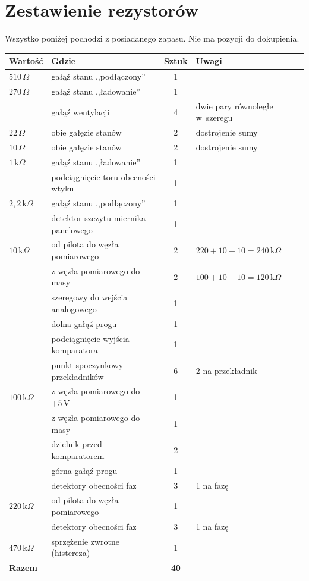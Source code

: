 \documentclass[a4paper,11pt]{article}
\newcommand{\ohm}{\,\Omega}
\newcommand{\kohm}{\,\mathrm{k}\Omega}
\newcommand{\volt}{\,\mathrm{V}}
\begin{document}
\section{Zestawienie rezystorów}
\label{sec:zestawienie}

Wszystko poniżej pochodzi z posiadanego zapasu. Nie ma pozycji do dokupienia.

\begin{center}
\begin{tabular}{llcl}
\toprule
Wartość & Gdzie & Sztuk & Uwagi \\
\midrule
$510\ohm$  & gałąź stanu ,,podłączony'' & 1 & \\
$270\ohm$  & gałąź stanu ,,ładowanie''  & 1 & \\
           & gałąź wentylacji           & 4 & dwie pary równoległe w~szeregu \\
$22\ohm$   & obie gałęzie stanów        & 2 & dostrojenie sumy \\
$10\ohm$   & obie gałęzie stanów        & 2 & dostrojenie sumy \\
\midrule
$1\kohm$   & gałąź stanu ,,ładowanie''  & 1 & \\
           & podciągnięcie toru obecności wtyku & 1 & \\
$2{,}2\kohm$ & gałąź stanu ,,podłączony'' & 1 & \\
           & detektor szczytu miernika panelowego & 1 & \\
$10\kohm$  & od pilota do węzła pomiarowego & 2 & $220+10+10=240\kohm$ \\
           & z węzła pomiarowego do masy & 2 & $100+10+10=120\kohm$ \\
           & szeregowy do wejścia analogowego & 1 & \\
           & dolna gałąź progu & 1 & \\
           & podciągnięcie wyjścia komparatora & 1 & \\
           & punkt spoczynkowy przekładników & 6 & 2 na przekładnik \\
$100\kohm$ & z węzła pomiarowego do $+5\volt$ & 1 & \\
           & z węzła pomiarowego do masy & 1 & \\
           & dzielnik przed komparatorem & 2 & \\
           & górna gałąź progu & 1 & \\
           & detektory obecności faz & 3 & 1 na fazę \\
$220\kohm$ & od pilota do węzła pomiarowego & 1 & \\
           & detektory obecności faz & 3 & 1 na fazę \\
$470\kohm$ & sprzężenie zwrotne (histereza) & 1 & \\
\midrule
\multicolumn{2}{l}{\textbf{Razem}} & \textbf{40} & \\
\bottomrule
\end{tabular}
\end{center}
\end{document}
